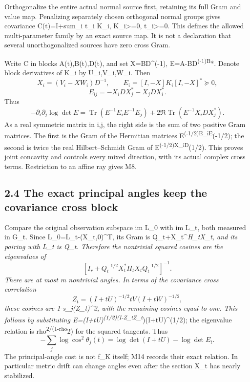 Orthogonalize the entire actual normal source first, retaining its full Gram and value map. Penalizing separately chosen orthogonal normal groups gives covariance C(t)=I+sum\_i t\_i K\_i, K\_i\textgreater=0, t\_i\textgreater=0. This defines the allowed multi-parameter family by an exact source map. It is not a declaration that several unorthogonalized sources have zero cross Gram.

Write C in blocks A(t),B(t),D(t), and set X=BD\^{}(-1), E=A-BD\textsuperscript{(-1)B}*. Denote block derivatives of K\_i by U\_i,V\_i,W\_i. Then \[
 X_i=(V_i-XW_i)D^{-1},\qquad
 E_i=[I,-X]K_i[I,-X]^*\succeq0,
\] \[
 E_{ij}=-X_iDX_j^*-X_jDX_i^*.
\] Thus \[
 \boxed{-\partial_i\partial_j\log\det E
 =\operatorname{Tr}(E^{-1}E_iE^{-1}E_j)
 +2\Re\operatorname{Tr}(E^{-1}X_iDX_j^*).}\tag{M12}
\] As a real symmetric matrix in i,j, the right side is the sum of two positive Gram matrices. The first is the Gram of the Hermitian matrices E\textsuperscript{(-1/2)E\_iE}(-1/2); the second is twice the real Hilbert--Schmidt Gram of E\textsuperscript{(-1/2)X\_iD}(1/2). This proves joint concavity and controls every mixed direction, with its actual complex cross terms. Restriction to an affine ray gives M8.

\subsection{2.4 The exact principal angles keep the covariance cross block}\label{the-exact-principal-angles-keep-the-covariance-cross-block}

Compare the original observation subspace im L\_0 with im L\_t, both measured in G\_t. Since L\_0=L\_t-(X\_t,0)\^{}T, its Gram is Q\_t+X\_t\^{}\emph{H\_tX\_t, and its pairing with L\_t is Q\_t. Therefore the nontrivial squared cosines are the eigenvalues of \[
 [I_r+Q_t^{-1/2}X_t^*H_tX_tQ_t^{-1/2}]^{-1}.
 \tag{M13}
\] There are at most m nontrivial angles. In terms of the covariance cross correlation \[
 Z_t=(I+tU)^{-1/2}tV(I+tW)^{-1/2},
\] these cosines are 1-s\_j(Z\_t)\^{}2, with the remaining cosines equal to one. This follows by substituting E=(I+tU)\textsuperscript{(1/2)(I-Z\_tZ\_t}})(I+tU)\^{}(1/2); the eigenvalue relation is rho\textsuperscript{2/(1-rho}2) for the squared tangents. Thus \[
 \boxed{-\sum_j\log\cos^2\theta_j(t)
 =\log\det(I+tU)-\log\det E_t.}\tag{M14}
\] The principal-angle cost is not f\_K itself; M14 records their exact relation. In particular metric drift can change angles even after the section X\_t has nearly stabilized.

